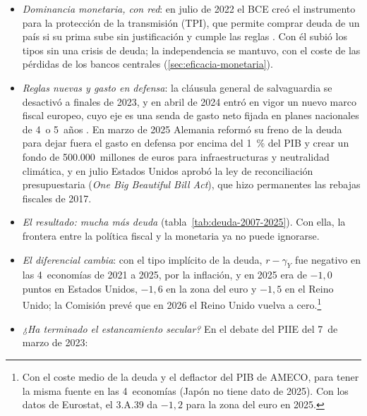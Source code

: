 \documentclass[11pt]{article}
\begin{document}
\begin{itemize}
\begin{itemize}
  \item el caso extremo fue el Reino Unido: el 23~de septiembre de 2022, un plan de rebajas de impuestos sin financiar, junto a unas ayudas a la energía de unos 60.000~millones de libras en 6~meses, disparó los tipos de la deuda, y el Banco de Inglaterra, que estaba subiendo los tipos, tuvo que comprar deuda a largo plazo para frenar la crisis de los fondos de pensiones\nocite{BoE2022Gilts}: fiscal expansiva y monetaria contractiva, «revueltos».
  \end{itemize}
\item \emph{Dominancia monetaria, con red}: en julio de 2022 el BCE creó el instrumento para la protección de la transmisión (TPI), que permite comprar deuda de un país si su prima sube sin justificación y cumple las reglas\nocite{BCE2022TPI} . Con él subió los tipos sin una crisis de deuda; la independencia se mantuvo, con el coste de las pérdidas de los bancos centrales (\ref{sec:eficacia-monetaria}).
\item \emph{Reglas nuevas y gasto en defensa}: la cláusula general de salvaguardia se desactivó a finales de 2023, y en abril de 2024 entró en vigor un nuevo marco fiscal europeo, cuyo eje es una senda de gasto neto fijada en planes nacionales de 4~o 5~años\nocite{UE2024Marco} . En marzo de 2025 Alemania reformó su freno de la deuda para dejar fuera el gasto en defensa por encima del 1~\% del PIB y crear un fondo de 500.000~millones de euros para infraestructuras y neutralidad climática, y en julio Estados Unidos aprobó la ley de reconciliación presupuestaria (\emph{One Big Beautiful Bill Act}), que hizo permanentes las rebajas fiscales de 2017.
\item \emph{El resultado: mucha más deuda} (tabla~\ref{tab:deuda-2007-2025}). Con ella, la frontera entre la política fiscal y la monetaria ya no puede ignorarse.
\item \emph{El diferencial cambia}: con el tipo implícito de la deuda, $r-\gamma_Y$ fue negativo en las 4~economías de 2021 a 2025, por la inflación, y en 2025 era de $-1{,}0$ puntos en Estados Unidos, $-1{,}6$ en la zona del euro y $-1{,}5$ en el Reino Unido; la Comisión prevé que en 2026 el Reino Unido vuelva a cero\nocite{CE2026AMECO}.\footnote{Con el coste medio de la deuda y el deflactor del PIB de AMECO, para tener la misma fuente en las 4~economías (Japón no tiene dato de 2025). Con los datos de Eurostat, el 3.A.39 da $-1{,}2$ para la zona del euro en 2025.}
\item \emph{¿Ha terminado el estancamiento secular?} En el debate del PIIE del 7~de marzo de 2023\nocite{PIIE2023Debate}:

\end{itemize}
\end{document}
